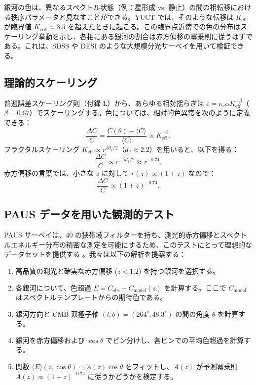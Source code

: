 \documentclass[11pt,a4paper]{article}
\newcommand{\Keff}{K_{\mathrm{eff}}}
\begin{document}
	銀河の色は、異なるスペクトル状態（例：星形成 vs. 静止）の間の相転移における秩序パラメータと見なすことができる。YUCT では、そのような転移は \(K_{\mathrm{eff}}\) が臨界値 \(K_{\mathrm{crit}} \approx 8.5\) を超えたときに起こる。この臨界点近傍での色の分布はスケーリング挙動を示し、各相にある銀河の割合は赤方偏移の冪乗則に従うはずである。これは、SDSS や DESI のような大規模分光サーベイを用いて検証できる。
	
	\subsection{理論的スケーリング}
	
	普遍誤差スケーリング則（付録 L）から、あらゆる相対揺らぎは \(\varepsilon = \kappa_c \alpha \Keff^{-\beta}\)（\(\beta = 0.67\)）でスケーリングする。色については、相対的色異常を次のように定義できる：
	\begin{equation}
		\frac{\Delta C}{C} = \frac{C(\theta) - \langle C \rangle}{\langle C \rangle} \propto \Keff^{-\beta}.
	\end{equation}
	フラクタルスケーリング \(\Keff \propto r^{\beta d_f/2}\)（\(d_f \approx 2.2\)）を用いると、以下を得る：
	\begin{equation}
		\frac{\Delta C}{C} \propto r^{-\beta d_f/2} \approx r^{-0.74}.
	\end{equation}
	赤方偏移の言葉では、小さな \(z\) に対して \(r(z) \propto (1+z)\) なので：
	\begin{equation}
		\frac{\Delta C}{C} \propto (1+z)^{-0.74}.
	\end{equation}
	
	\subsection{PAUS データを用いた観測的テスト}
	
	PAUS サーベイは、40 の狭帯域フィルターを持ち、測光的赤方偏移とスペクトルエネルギー分布の精密な測定を可能にするため、このテストにとって理想的なデータセットを提供する \cite{Alarcon2019}。我々は以下の解析を提案する：
	
	\begin{enumerate}
		\item 高品質の測光と確実な赤方偏移 (\(z < 1.2\)) を持つ銀河を選択する。
		\item 各銀河について、色超過 \(E = C_{\mathrm{obs}} - C_{\mathrm{model}}(z)\) を計算する。ここで \(C_{\mathrm{model}}\) はスペクトルテンプレートからの期待色である。
		\item 銀河方向と CMB 双極子軸 \((l,b) = (264^\circ, 48.3^\circ)\) の間の角度 \(\theta\) を計算する。
		\item 銀河を赤方偏移および \(\cos\theta\) でビン分けし、各ビンでの平均色超過を計算する。
		\item 関数 \(\langle E \rangle(z,\cos\theta) = A(z) \cos\theta\) をフィットし、\(A(z)\) が予測冪乗則 \(A(z) \propto (1+z)^{-0.74}\) に従うかどうかを検定する。
	\end{enumerate}
	
\end{document}
